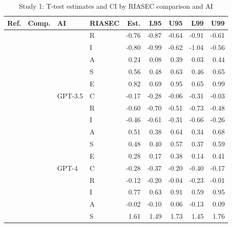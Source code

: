 \begin{table}

\caption{Study 1: T-test estimates and CI by RIASEC comparison and AI}
\centering
\fontsize{8}{10}\selectfont
\begin{tabular}[t]{llllrrrrr}
\toprule
Ref. & Comp. & AI & RIASEC & Est. & L95 & U95 & L99 & U99\\
\midrule
 &  &  & R & -0.76 & -0.87 & -0.64 & -0.91 & -0.61\\

 &  &  & I & -0.80 & -0.99 & -0.62 & -1.04 & -0.56\\

 &  &  & A & 0.24 & 0.08 & 0.39 & 0.03 & 0.44\\

 &  &  & S & 0.56 & 0.48 & 0.63 & 0.46 & 0.65\\

 &  &  & E & 0.82 & 0.69 & 0.95 & 0.65 & 0.99\\

 &  & \multirow[t]{-6}{*}{\raggedright\arraybackslash GPT-3.5} & C & -0.17 & -0.28 & -0.06 & -0.31 & -0.03\\

 &  &  & R & -0.60 & -0.70 & -0.51 & -0.73 & -0.48\\

 &  &  & I & -0.46 & -0.61 & -0.31 & -0.66 & -0.26\\

 &  &  & A & 0.51 & 0.38 & 0.64 & 0.34 & 0.68\\

 &  &  & S & 0.48 & 0.40 & 0.57 & 0.37 & 0.59\\

 &  &  & E & 0.28 & 0.17 & 0.38 & 0.14 & 0.41\\

 &  & \multirow[t]{-6}{*}{\raggedright\arraybackslash GPT-4} & C & -0.28 & -0.37 & -0.20 & -0.40 & -0.17\\

 &  &  & R & -0.12 & -0.20 & -0.04 & -0.23 & -0.01\\

 &  &  & I & 0.77 & 0.63 & 0.91 & 0.59 & 0.95\\

 &  &  & A & -0.02 & -0.10 & 0.06 & -0.13 & 0.09\\

 &  &  & S & 1.61 & 1.49 & 1.73 & 1.45 & 1.76\\


\end{tabular}
\end{table}
